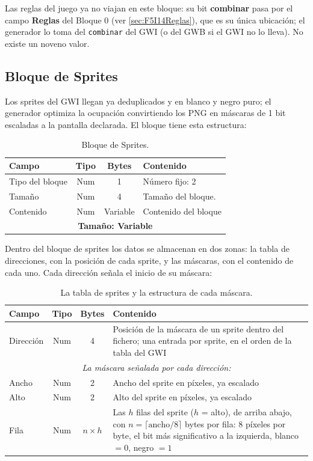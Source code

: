 Las reglas del juego ya no viajan en este bloque: su bit \textbf{combinar} pasa por el campo \textbf{Reglas} del Bloque 0 (ver \ref{sec:F5I14Reglas}), que es su única ubicación; el generador lo toma del \texttt{combinar} del GWI (o del GWB si el GWI no lo lleva). No existe un noveno valor.


\subsection{Bloque de Sprites}
\label{sec:A02GWCSprites}

Los sprites del GWI llegan ya deduplicados y en blanco y negro
puro; el generador optimiza la ocupación convirtiendo los PNG en máscaras de 1 bit escaladas a
la pantalla declarada. El bloque tiene esta estructura:

\begin{table}[htbp]
	\centering
	\begin{tabular}{|l|c|c|p{8.4cm}|}
		\hline
		\textbf{Campo} & \textbf{Tipo} & \textbf{Bytes} & \textbf{Contenido} \\
		\hline
		Tipo del bloque & Num & 1 & Número fijo: 2 \\ \hline
		Tamaño & Num & 4 & Tamaño del bloque. \\ \hline
		Contenido & Num & Variable & Contenido del bloque \\
		
		\hline\hline
		\multicolumn{4}{c}{\textbf{Tamaño: Variable}} \\ \hline
	\end{tabular}
	\caption{Bloque de Sprites.}
\end{table}

Dentro del bloque de sprites los datos se almacenan en dos zonas: la tabla de direcciones, con la posición de cada sprite, y las máscaras, con el contenido de cada uno. Cada dirección señala el inicio de su máscara:

\begin{table}[H]
	\centering
	\begin{tabular}{|l|c|c|p{8.4cm}|}
		\hline
		\textbf{Campo} & \textbf{Tipo} & \textbf{Bytes} & \textbf{Contenido} \\
		\hline
		Dirección & Num & 4 & Posición de la máscara de un sprite dentro
		del fichero; una entrada por sprite, en el orden de la tabla del
		GWI \\
		\hline
		\multicolumn{4}{|c|}{\textit{La máscara señalada por cada
				dirección:}} \\
		\hline
		Ancho & Num & 2 & Ancho del sprite en píxeles, ya escalado \\
		\hline
		Alto & Num & 2 & Alto del sprite en píxeles, ya escalado \\
		\hline
		Fila & Num & $n \times h$ & Las $h$ filas del sprite ($h$ = alto),
		de arriba abajo, con $n = \lceil \text{ancho}/8 \rceil$ bytes por
		fila: 8 píxeles por byte, el bit más significativo a la izquierda,
		blanco $= 0$, negro $= 1$ \\
		\hline
	\end{tabular}
	\caption{La tabla de sprites y la estructura de cada máscara.}
\end{table}

